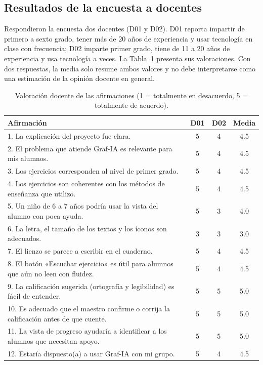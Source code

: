 \subsection{Resultados de la encuesta a docentes}
\label{sec:resultados-docentes}

Respondieron la encuesta dos docentes (D01 y D02). D01 reporta impartir de primero a sexto grado, tener más de 20 años de experiencia y usar tecnología en clase con frecuencia; D02 imparte primer grado, tiene de 11 a 20 años de experiencia y usa tecnología a veces. La Tabla~\ref{tab:resultados-docentes} presenta sus valoraciones. Con dos respuestas, la media solo resume ambos valores y no debe interpretarse como una estimación de la opinión docente en general.

\begin{table}[H]
\centering
\caption{Valoración docente de las afirmaciones (1 = totalmente en desacuerdo, 5 = totalmente de acuerdo).}
\label{tab:resultados-docentes}
\renewcommand{\arraystretch}{1.3}
\begin{tabular}{|p{9.6cm}|c|c|c|}
\hline
\textbf{Afirmación} & \textbf{D01} & \textbf{D02} & \textbf{Media} \\ \hline
1. La explicación del proyecto fue clara. & 5 & 4 & 4.5 \\ \hline
2. El problema que atiende Graf-IA es relevante para mis alumnos. & 5 & 4 & 4.5 \\ \hline
3. Los ejercicios corresponden al nivel de primer grado. & 5 & 4 & 4.5 \\ \hline
4. Los ejercicios son coherentes con los métodos de enseñanza que utilizo. & 5 & 4 & 4.5 \\ \hline
5. Un niño de 6 a 7 años podría usar la vista del alumno con poca ayuda. & 5 & 3 & 4.0 \\ \hline
6. La letra, el tamaño de los textos y los íconos son adecuados. & 3 & 3 & 3.0 \\ \hline
7. El lienzo se parece a escribir en el cuaderno. & 5 & 4 & 4.5 \\ \hline
8. El botón «Escuchar ejercicio» es útil para alumnos que aún no leen con fluidez. & 5 & 4 & 4.5 \\ \hline
9. La calificación sugerida (ortografía y legibilidad) es fácil de entender. & 5 & 5 & 5.0 \\ \hline
10. Es adecuado que el maestro confirme o corrija la calificación antes de que cuente. & 5 & 5 & 5.0 \\ \hline
11. La vista de progreso ayudaría a identificar a los alumnos que necesitan apoyo. & 5 & 5 & 5.0 \\ \hline
12. Estaría dispuesto(a) a usar Graf-IA con mi grupo. & 5 & 4 & 4.5 \\ \hline
\end{tabular}
\end{table}

